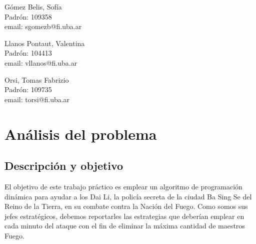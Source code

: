 \documentclass{article}
\begin{document}
\begin{titlepage}
\begin{center}
    {\begin{minipage}[t]{.32\textwidth}
        \begin{center}
          Gómez Belis, Sofía\\
          {\small{Padrón: 109358}}\\
          {\small{email: sgomezb@fi.uba.ar}}
        \end{center}
          \end{minipage}
          \begin{minipage}[t]{.32\textwidth}
        \begin{center}
          Llanos Pontaut, Valentina\\
          {\small{Padrón: 104413}}\\
          {\small{email: vllanos@fi.uba.ar}}\\
        \end{center}
      \end{minipage}
      \begin{minipage}[t]{.32\textwidth}
        \begin{center}
          Orsi, Tomas Fabrizio\\
          {\small{Padrón: 109735}}\\
          {\small{email: torsi@fi.uba.ar}}
        \end{center}
      \end{minipage}}

  \end{center}
\end{titlepage}

\renewcommand*\contentsname{Indice}
\tableofcontents
\pagebreak

\section{Análisis del problema}
\subsection{Descripción y objetivo}

El objetivo de este trabajo práctico es emplear un algoritmo de programación dinámica para ayudar a los Dai Li, la policía secreta de la ciudad Ba Sing Se del Reino de la Tierra, en su combate contra la Nación del Fuego. Como somos sus jefes estratégicos, debemos reportarles las estrategias que deberían emplear en cada minuto del ataque con el fin de eliminar la máxima cantidad de maestros Fuego.
\end{document}
